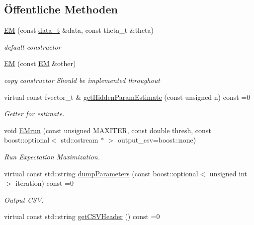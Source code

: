 \subsection*{Öffentliche Methoden}
\begin{DoxyCompactItemize}
\item 
\hyperlink{classCDA_1_1EM_a1b30d405dee72fbf3ef58efffb52add4}{EM} (const \hyperlink{classCDA_1_1EM_a3f4735ec5ea6c523ebc4c9f2b51be762}{data\_\-t} \&data, const theta\_\-t \&theta)
\begin{DoxyCompactList}\small\item\em default constructor \item\end{DoxyCompactList}\item 
\hypertarget{classCDA_1_1EM_a933f9974eec46113eadf9f35ac9b7552}{
\hyperlink{classCDA_1_1EM_a933f9974eec46113eadf9f35ac9b7552}{EM} (const \hyperlink{classCDA_1_1EM}{EM} \&other)}
\label{classCDA_1_1EM_a933f9974eec46113eadf9f35ac9b7552}

\begin{DoxyCompactList}\small\item\em copy constructor Should be implemented throughout \item\end{DoxyCompactList}\item 
\hypertarget{classCDA_1_1EM_aad68b7444dac8fa5e1b0d7413c8ed87c}{
virtual const fvector\_\-t \& \hyperlink{classCDA_1_1EM_aad68b7444dac8fa5e1b0d7413c8ed87c}{getHiddenParamEstimate} (const unsigned n) const =0}
\label{classCDA_1_1EM_aad68b7444dac8fa5e1b0d7413c8ed87c}

\begin{DoxyCompactList}\small\item\em Getter for estimate. \item\end{DoxyCompactList}\item 
void \hyperlink{classCDA_1_1EM_a1c8fa9008da1f168f211f48c578dce5f}{EMrun} (const unsigned MAXITER, const double thresh, const boost::optional$<$ std::ostream $\ast$ $>$ output\_\-csv=boost::none)
\begin{DoxyCompactList}\small\item\em Run Expectation Maximization. \item\end{DoxyCompactList}\item 
virtual const std::string \hyperlink{classCDA_1_1EM_ad2deb0f1d94dc57a6e431caebeb34cbe}{dumpParameters} (const boost::optional$<$ unsigned int $>$ iteration) const =0
\begin{DoxyCompactList}\small\item\em Output CSV. \item\end{DoxyCompactList}\item 
\hypertarget{classCDA_1_1EM_a50155b932fe3a55103550fd69318b45f}{
virtual const std::string \hyperlink{classCDA_1_1EM_a50155b932fe3a55103550fd69318b45f}{getCSVHeader} () const =0}
\label{classCDA_1_1EM_a50155b932fe3a55103550fd69318b45f}


\end{DoxyCompactItemize}
